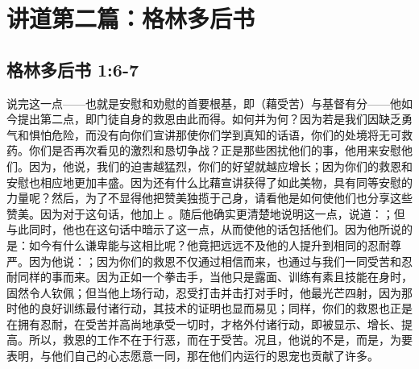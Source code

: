 
\section{讲道第二篇：格林多后书}


\subsection{格林多后书 1:6-7}

\par

说完这一点——也就是安慰和劝慰的首要根基，即（藉受苦）与基督有分——他如今提出第二点，即门徒自身的救恩由此而得。如何并为何？因为若是我们因缺乏勇气和惧怕危险，而没有向你们宣讲那使你们学到真知的话语，你们的处境将无可救药。你们是否再次看见的激烈和恳切争战？正是那些困扰他们的事，他用来安慰他们。因为，他说，我们的迫害越猛烈，你们的好望就越应增长；因为你们的救恩和安慰也相应地更加丰盛。因为还有什么比藉宣讲获得了如此美物，具有同等安慰的力量呢？然后，为了不显得他把赞美独揽于己身，请看他是如何使他们也分享这些赞美。因为对于这句话，他加上 。随后他确实更清楚地说明这一点，说道：；但与此同时，他也在这句话中暗示了这一点，从而使他的话包括他们。因为他所说的是：如今有什么谦卑能与这相比呢？他竟把远远不及他的人提升到相同的忍耐尊严。因为他说：；因为你们的救恩不仅通过相信而来，也通过与我们一同受苦和忍耐同样的事而来。因为正如一个拳击手，当他只是露面、训练有素且技能在身时，固然令人钦佩；但当他上场行动，忍受打击并击打对手时，他最光芒四射，因为那时他的良好训练最付诸行动，其技术的证明也显而易见；同样，你们的救恩也正是在拥有忍耐，在受苦并高尚地承受一切时，才格外付诸行动，即被显示、增长、提高。所以，救恩的工作不在于行恶，而在于受苦。况且，他说的不是，而是，为要表明，与他们自己的心志愿意一同，那在他们内运行的恩宠也贡献了许多。\par


